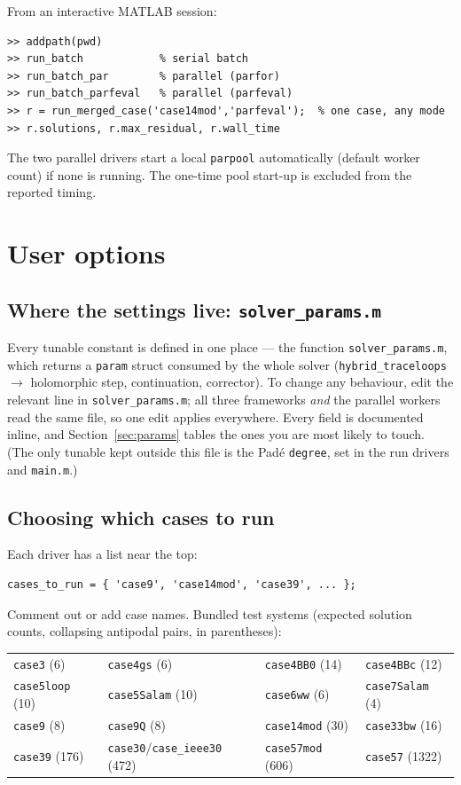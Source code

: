 \documentclass[11pt,a4paper]{article}
\newcommand{\code}[1]{\texttt{#1}}
\begin{document}
From an interactive MATLAB session:
\begin{lstlisting}[style=mat]
>> addpath(pwd)
>> run_batch            % serial batch
>> run_batch_par        % parallel (parfor)
>> run_batch_parfeval   % parallel (parfeval)
>> r = run_merged_case('case14mod','parfeval');  % one case, any mode
>> r.solutions, r.max_residual, r.wall_time
\end{lstlisting}

The two parallel drivers start a local \code{parpool} automatically (default worker
count) if none is running. The one-time pool start-up is excluded from the reported
timing.

\section{User options}

\subsection{Where the settings live: \code{solver_params.m}}
Every tunable constant is defined in one place --- the function \code{solver_params.m},
which returns a \code{param} struct consumed by the whole solver (\code{hybrid_traceloops}
$\to$ holomorphic step, continuation, corrector). To change any behaviour, edit the
relevant line in \code{solver_params.m}; all three frameworks \emph{and} the parallel
workers read the same file, so one edit applies everywhere. Every field is documented
inline, and Section~\ref{sec:params} tables the ones you are most likely to touch. (The
only tunable kept outside this file is the Pad\'e \code{degree}, set in the run drivers and
\code{main.m}.)

\subsection{Choosing which cases to run}
Each driver has a list near the top:
\begin{lstlisting}[style=mat]
cases_to_run = { 'case9', 'case14mod', 'case39', ... };
\end{lstlisting}
Comment out or add case names. Bundled test systems (expected solution counts, collapsing
antipodal pairs, in parentheses):

\begin{center}\small
\begin{tabular}{@{}llll@{}}
\toprule
\code{case3} (6) & \code{case4gs} (6) & \code{case4BB0} (14) & \code{case4BBc} (12)\\
\code{case5loop} (10) & \code{case5Salam} (10) & \code{case6ww} (6) & \code{case7Salam} (4)\\
\code{case9} (8) & \code{case9Q} (8) & \code{case14mod} (30) & \code{case33bw} (16)\\
\code{case39} (176) & \code{case30}/\code{case_ieee30} (472) & \code{case57mod} (606) & \code{case57} (1322)\\
\bottomrule
\end{tabular}
\end{center}
\end{document}
